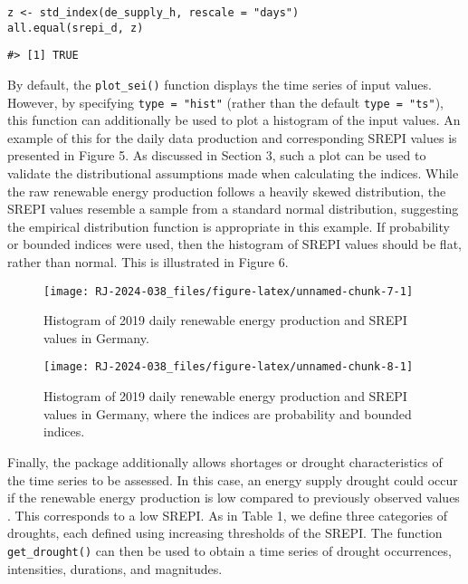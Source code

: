 \begin{verbatim}
z <- std_index(de_supply_h, rescale = "days")
all.equal(srepi_d, z)
\end{verbatim}

\begin{verbatim}
#> [1] TRUE
\end{verbatim}

By default, the \texttt{plot\_sei()} function displays the time series of input values. However, by specifying \texttt{type\ =\ "hist"} (rather than the default \texttt{type\ =\ "ts"}), this function can additionally be used to plot a histogram of the input values. An example of this for the daily data production and corresponding SREPI values is presented in Figure 5. As discussed in Section 3, such a plot can be used to validate the distributional assumptions made when calculating the indices. While the raw renewable energy production follows a heavily skewed distribution, the SREPI values resemble a sample from a standard normal distribution, suggesting the empirical distribution function is appropriate in this example. If probability or bounded indices were used, then the histogram of SREPI values should be flat, rather than normal. This is illustrated in Figure 6.

\begin{figure}

{\centering \texttt{[image: RJ-2024-038\_files/figure-latex/unnamed-chunk-7-1]} 

}

\caption{Histogram of 2019 daily renewable energy production and SREPI values in Germany.}\label{fig:unnamed-chunk-7}
\end{figure}

\begin{figure}

{\centering \texttt{[image: RJ-2024-038\_files/figure-latex/unnamed-chunk-8-1]} 

}

\caption{Histogram of 2019 daily renewable energy production and SREPI values in Germany, where the indices are probability and bounded indices.}\label{fig:unnamed-chunk-8}
\end{figure}

Finally, the  package additionally allows shortages or drought characteristics of the time series to be assessed. In this case, an energy supply drought could occur if the renewable energy production is low compared to previously observed values \citep{AllenOtero2023}. This corresponds to a low SREPI. As in Table 1, we define three categories of droughts, each defined using increasing thresholds of the SREPI. The function \texttt{get\_drought()} can then be used to obtain a time series of drought occurrences, intensities, durations, and magnitudes.

